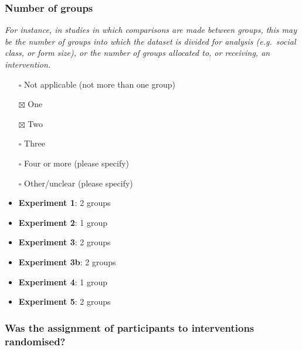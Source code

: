 \documentclass[
  doc, a4paper]{apa7}
\begin{document}
\subsubsection{Number of groups}\label{number-of-groups}

\emph{For instance, in studies in which comparisons are made between groups, this may be the number of groups into which the dataset is divided for analysis (e.g.~social class, or form size), or the number of groups allocated to, or receiving, an intervention.}

\begin{itemize}
\item[$\square$]
  Not applicable (not more than one group)\\
\item[$\boxtimes$]
  One\\
\item[$\boxtimes$]
  Two\\
\item[$\square$]
  Three\\
\item[$\square$]
  Four or more (please specify)\\
\item[$\square$]
  Other/unclear (please specify)
\item
  \textbf{Experiment 1}: 2 groups\\
\item
  \textbf{Experiment 2}: 1 group
\item
  \textbf{Experiment 3}: 2 groups
\item
  \textbf{Experiment 3b}: 2 groups
\item
  \textbf{Experiment 4}: 1 group
\item
  \textbf{Experiment 5}: 2 groups
\end{itemize}

\subsubsection{Was the assignment of participants to interventions randomised?}\label{was-the-assignment-of-participants-to-interventions-randomised}
\end{document}
